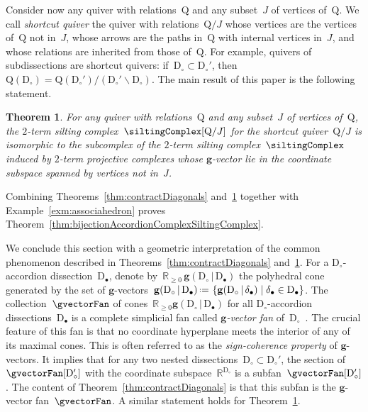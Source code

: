 \documentclass{amsart}
\newtheorem{theorem}{Theorem}%
\theoremstyle{definition}
\newcommand{\R}{\mathbb{R}} %
\renewcommand{\b}[1]{\mathbf{#1}} %
\newcommand{\set}[2]{\left\{ #1 \;\middle|\; #2 \right\}} %
\newcommand{\ssm}{\smallsetminus} %
\newcommand{\eqdef}{\mbox{\,\raisebox{0.2ex}{\scriptsize\ensuremath{\mathrm:}}\ensuremath{=}\,}} %
\newcommand{\darkblue}{\color{darkblue}} %
\newcommand{\defn}[1]{\textsl{\darkblue #1}} %
\newcommand{\dissection}{\mathrm{D}} %
\newcommand{\gvector}[2]{\mathbf{g}(#1 \,|\, #2)} %
\newcommand{\quiver}{\mathrm{Q}} %
\begin{document}
Consider now any quiver with relations~$\quiver$ and any subset~$J$ of vertices of~$\quiver$.
We call \defn{shortcut quiver} the quiver with relations~$\quiver/J$ whose vertices are the vertices of~$\quiver$ not in~$J$, whose arrows are the paths in~$\quiver$ with internal vertices in~$J$, and whose relations are inherited from those of~$\quiver$.
For example, quivers of subdissections are shortcut quivers: if~$\dissection_\circ \subset \dissection_\circ'$, then~${\quiver(\dissection_\circ) = \quiver(\dissection_\circ')/(\dissection_\circ' \ssm \dissection_\circ)}$.
The main result of this paper is the following statement.

\begin{theorem}
\label{thm:contractVertices}
For any quiver with relations~$\quiver$ and any subset~$J$ of vertices of~$\quiver$, the $2$-term silting complex~$\siltingComplex[\quiver/J]$ for the shortcut quiver~$\quiver/J$ is isomorphic to the subcomplex of the $2$-term silting complex~$\siltingComplex$ induced by $2$-term projective complexes whose $\b{g}$-vector lie in the coordinate subspace spanned by vertices not in~$J$.
\end{theorem}

Combining Theorems~\ref{thm:contractDiagonals} and~\ref{thm:contractVertices} together with Example~\ref{exm:associahedron} proves Theorem~\ref{thm:bijectionAccordionComplexSiltingComplex}.

We conclude this section with a geometric interpretation of the common phenomenon described in Theorems~\ref{thm:contractDiagonals} and~\ref{thm:contractVertices}.
For a $\dissection_\circ$-accordion dissection~$\dissection_\bullet$, denote by~$\R_{\ge0}\,\gvector{\dissection_\circ}{\dissection_\bullet}$ the polyhedral cone generated by the set of $\b{g}$-vectors~$\gvector{\dissection_\circ}{\dissection_\bullet} \eqdef \set{\gvector{\dissection_\circ}{\delta_\bullet}}{\delta_\bullet \in \dissection_\bullet}$. The collection~$\gvectorFan$ of cones~$\R_{\ge0}\gvector{\dissection_\circ}{\dissection_\bullet}$ for all $\dissection_\circ$-accordion dissections~$\dissection_\bullet$
is a complete simplicial fan called \defn{$\b{g}$-vector fan} of~$\dissection_\circ$~\cite{MannevillePilaud-accordion}.
The crucial feature of this fan is that no coordinate hyperplane meets the interior of any of its maximal cones.
This is often referred to as the \defn{sign-coherence property} of $\b{g}$-vectors.
It implies that for any two nested dissections~$\dissection_\circ \subset \dissection_\circ'$, the section of~$\gvectorFan[\dissection_\circ']$ with the coordinate subspace~$\R^{\dissection_\circ}$ is a subfan~$\gvectorFan[\dissection_\circ']$.
The content of Theorem~\ref{thm:contractDiagonals} is that this subfan is the $\b{g}$-vector fan~$\gvectorFan$.
A similar statement holds for Theorem~\ref{thm:contractVertices}.
\end{document}

